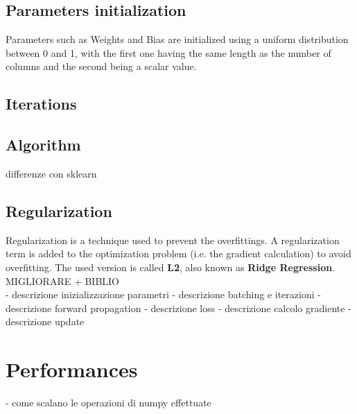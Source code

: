 \documentclass[
	letterpaper, %
	10pt, %
]{class}
\begin{document}
\subsection{Parameters initialization}
Parameters such as Weights and Bias are initialized using a uniform distribution between 0 and 1, with the first one having the same length as the number of columns and the second being a scalar value.

\subsection{Iterations}

\subsection{Algorithm}

differenze con sklearn



\subsection{Regularization}
Regularization is a technique used to prevent the overfittings. A regularization term is added to the optimization problem (i.e. the gradient calculation) to avoid overfitting.
The used version is called \textbf{L2}, also known as \textbf{Ridge Regression}. MIGLIORARE + BIBLIO\\



- descrizione inizializzazione parametri
- descrizione batching e iterazioni
- descrizione forward propagation
- descrizione loss
- descrizione calcolo gradiente
- descrizione update


\section{Performances}

- come scalano le operazioni di numpy effettuate

\end{document}
